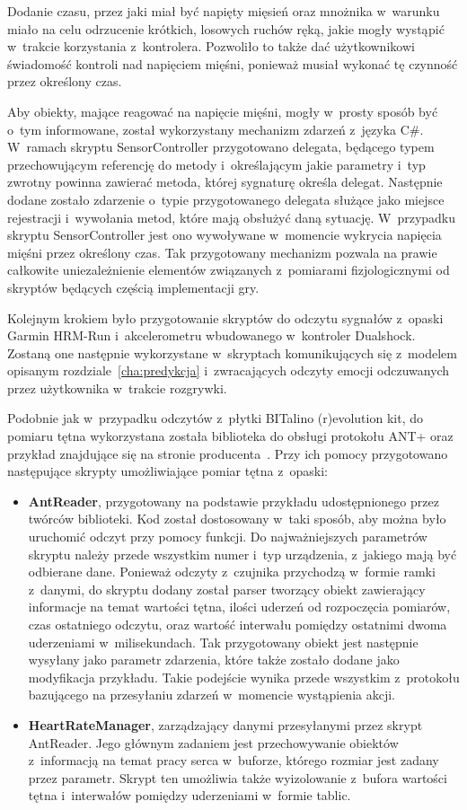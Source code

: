 Dodanie czasu, przez jaki miał być napięty mięsień oraz mnożnika w~warunku miało na celu odrzucenie krótkich, losowych ruchów ręką, jakie mogły wystąpić w~trakcie korzystania z~kontrolera. Pozwoliło to także dać użytkownikowi świadomość kontroli nad napięciem mięśni, ponieważ musiał wykonać tę czynność przez określony czas.

Aby obiekty, mające reagować na napięcie mięśni, mogły w~prosty sposób być o~tym informowane, został wykorzystany mechanizm zdarzeń z~języka C\#. W~ramach skryptu SensorController przygotowano delegata, będącego typem przechowującym referencję do metody i~określającym jakie parametry i~typ zwrotny powinna zawierać metoda, której sygnaturę określa delegat. Następnie dodane zostało zdarzenie o~typie przygotowanego delegata służące jako miejsce rejestracji i~wywołania metod, które mają obsłużyć daną sytuację. W~przypadku skryptu SensorController jest ono wywoływane w~momencie wykrycia napięcia mięśni przez określony czas. Tak przygotowany mechanizm pozwala na prawie całkowite uniezależnienie elementów związanych z~pomiarami fizjologicznymi od skryptów będących częścią implementacji gry.

Kolejnym krokiem było przygotowanie skryptów do odczytu sygnałów z~opaski Garmin HRM-Run i~akcelerometru wbudowanego w~kontroler Dualshock. Zostaną one następnie wykorzystane w~skryptach komunikujących się z~modelem opisanym rozdziale~\ref{cha:predykcja} i~zwracających odczyty emocji odczuwanych przez użytkownika w~trakcie rozgrywki.

Podobnie jak w~przypadku odczytów z~płytki BITalino (r)evolution kit, do pomiaru tętna wykorzystana została biblioteka do obsługi protokołu ANT+ oraz przykład znajdujące się na stronie producenta~\cite{ant_sdk}. Przy ich pomocy przygotowano następujące skrypty umożliwiające pomiar tętna z~opaski:
\begin{itemize}
	\item \textbf{AntReader}, przygotowany na podstawie przykładu udostępnionego przez twórców biblioteki. Kod został dostosowany w~taki sposób, aby można było uruchomić odczyt przy pomocy funkcji. Do najważniejszych parametrów skryptu należy przede wszystkim numer i~typ urządzenia, z~jakiego mają być odbierane dane. Ponieważ odczyty z~czujnika przychodzą w~formie ramki z~danymi, do skryptu dodany został parser tworzący obiekt zawierający informacje na temat wartości tętna, ilości uderzeń od rozpoczęcia pomiarów, czas ostatniego odczytu, oraz wartość interwału pomiędzy ostatnimi dwoma uderzeniami w~milisekundach. Tak przygotowany obiekt jest następnie wysyłany jako parametr zdarzenia, które także zostało dodane jako modyfikacja przykładu. Takie podejście wynika przede wszystkim z~protokołu bazującego na przesyłaniu zdarzeń w~momencie wystąpienia akcji.
	\item \textbf{HeartRateManager}, zarządzający danymi przesyłanymi przez skrypt AntReader. Jego głównym zadaniem jest przechowywanie obiektów z~informacją na temat pracy serca w~buforze, którego rozmiar jest zadany przez parametr. Skrypt ten umożliwia także wyizolowanie z~bufora wartości tętna i~interwałów pomiędzy uderzeniami w~formie tablic.
\end{itemize}

